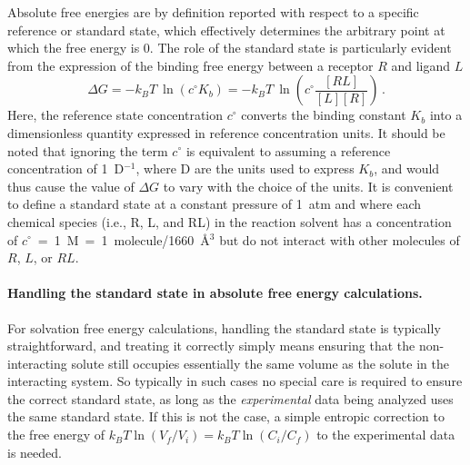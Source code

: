 \documentclass[9pt,bestpractices]{livecoms}
\begin{document}
Absolute free energies are by definition reported with respect to a specific reference or standard state, which effectively determines the arbitrary point at which the free energy is 0.
The role of the standard state is particularly evident from the expression of the binding free energy between a receptor $R$ and ligand $L$
\begin{equation} \label{eq:DGfromKAB}
    \Delta G = -k_BT ~ \ln \left( c^{\circ} K_b \right)  = -k_BT ~ \ln\left( c^{\circ} \frac{[RL]}{[L][R]} \right) \, .
\end{equation}
Here, the reference state concentration $c^{\circ}$ converts the binding constant $K_b$ into a dimensionless quantity expressed in reference concentration units.
It should be noted that ignoring the term $c^{\circ}$ is equivalent to assuming a reference concentration of 1~D$^{-1}$, where D are the units used to express $K_b$, and would thus cause the value of $\Delta G$ to vary with the choice of the units.
It is convenient to define a standard state at a constant pressure of 1~atm and where each chemical species (i.e., R, L, and RL) in the reaction solvent has a concentration of $c^{\circ}$~=~1~M~=~1~molecule/1660~\r{A}$^3$ but do not interact with other molecules of $R$, $L$, or $RL$.

\paragraph{Handling the standard state in absolute free energy calculations.}
For solvation free energy calculations, handling the standard state is typically straightforward, and treating it correctly simply means ensuring that the non-interacting solute still occupies essentially the same volume as the solute in the interacting system.
So typically in such cases no special care is required to ensure the correct standard state, as long as the \emph{experimental} data being analyzed uses the same standard state.
If this is not the case, a simple entropic correction to the free energy of $k_B T\ln (V_f/V_i) = k_B T \ln (C_i/C_f)$ to the experimental data is needed.
\end{document}
